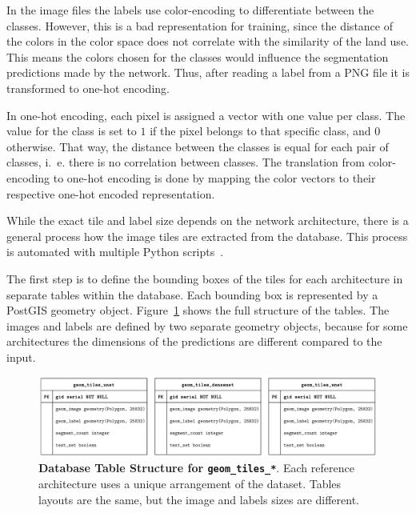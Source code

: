 In the image files the labels use color-encoding to differentiate between the classes. However, this is a bad representation for training, since the distance of the colors in the color space does not correlate with the similarity of the land use. This means the colors chosen for the classes would influence the segmentation predictions made by the network. Thus, after reading a label from a PNG file it is transformed to one-hot encoding.

In one-hot encoding, each pixel is assigned a vector with one value per class. The value for the class is set to $1$ if the pixel belongs to that specific class, and $0$ otherwise. That way, the distance between the classes is equal for each pair of classes, i.~e. there is no correlation between classes. The translation from color-encoding to one-hot encoding is done by mapping the color vectors to their respective one-hot encoded representation.

While the exact tile and label size depends on the network architecture, there is a general process how the image tiles are extracted from the database. This process is automated with multiple Python scripts~\cite[\texttt{scripts} folder]{thesis-code20}.

The first step is to define the bounding boxes of the tiles for each architecture in separate tables within the database. Each bounding box is represented by a  PostGIS geometry object. Figure~\ref{fig:geom_tiles_entities} shows the full structure of the tables. The images and labels are defined by two separate geometry objects, because for some architectures the dimensions of the predictions are different compared to the input.

\begin{figure}[h]
    \centering
    \includegraphics[width=\textwidth]{images/geom_tiles_entities}
    \caption[Database Table Structure for \texttt{geom\_tiles\_*}]
    {\textbf{Database Table Structure for \texttt{geom\_tiles\_*}}. Each reference architecture uses a unique arrangement of the dataset. Tables layouts are the same, but the image and labels sizes are different.}
    \label{fig:geom_tiles_entities}
\end{figure}

